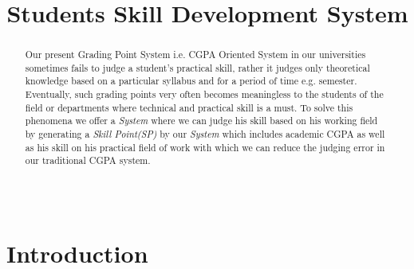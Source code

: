\documentclass[conference]{IEEEtran}
\begin{document}
\title{\textbf{Students Skill Development System}}

\author{

\and

}

\maketitle


\begin{abstract}
Our present Grading Point System i.e. CGPA Oriented System in our universities sometimes fails to judge a student's practical skill, rather it judges only theoretical knowledge based on a particular syllabus and for a period of time e.g. semester. Eventually, such grading points very often becomes meaningless to the students of the field or departments where technical and practical skill is a must. To solve this phenomena we offer a \textit{System} where we can judge his skill based on his working field by generating a \textit{Skill Point(SP)} by our \textit{System} which includes academic CGPA as well as his skill on his practical field of work with which we can reduce the judging error in our traditional CGPA system. \\\\\\
\end{abstract}


\IEEEpeerreviewmaketitle



\section{Introduction}
 
\end{document}
